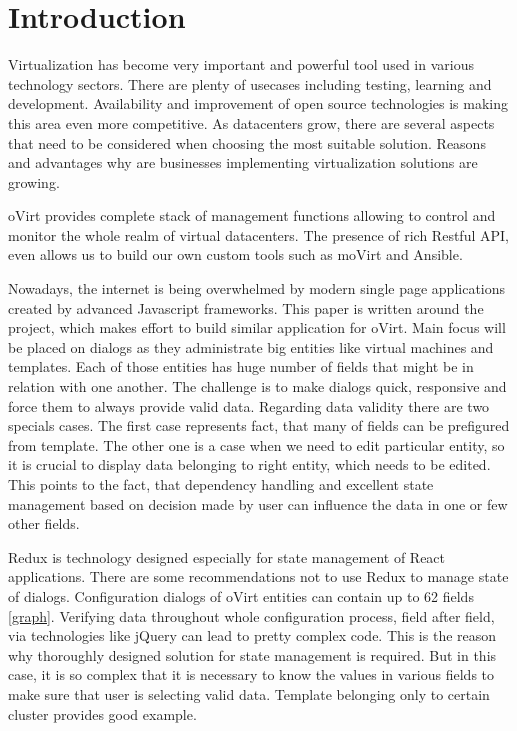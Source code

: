 
\chapter{Introduction}
Virtualization has become very important and powerful tool used in various technology sectors. There are plenty of usecases including testing, learning and development. Availability and improvement of open source technologies is making this area even more competitive. As datacenters grow, there are several aspects that need to be considered when choosing the most suitable solution. Reasons and advantages why are businesses implementing virtualization solutions are growing\cite{virtualization}.

oVirt\cite{oVirt} provides complete stack of management functions allowing to control and monitor the whole realm of virtual datacenters. The presence of rich Restful API, even allows us to build our own custom tools such as moVirt\cite{moVirt} and Ansible\cite{Ansible}. 

Nowadays, the internet is being overwhelmed by modern single page applications created by advanced Javascript frameworks. This paper is written around the project, which makes effort to build similar application for oVirt. Main focus will be placed on dialogs as they administrate big entities like virtual machines and templates. Each of those entities has huge number of fields that might be in relation with one another. The challenge is to make dialogs quick, responsive and force them to always provide valid data. Regarding data validity there are two specials cases. The first case represents fact, that many of fields can be prefigured from template. The other one is a case when we need to edit particular entity, so it is crucial to display data belonging to right entity, which needs to be edited. This points to the fact, that dependency handling and excellent state management based on decision made by user can influence the data in one or few other fields.

Redux is technology designed especially for state management of React\cite{React} applications. There are some recommendations not to use Redux\cite{Redux} to manage state of dialogs. Configuration dialogs of oVirt entities can contain up to 62 fields \ref{graph}. Verifying data throughout whole configuration process, field after field, via technologies like jQuery can lead to pretty complex code. This is the reason why thoroughly designed solution for state management is required. But in this case, it is so complex that it is necessary to know the values in various fields to make sure that user is selecting valid data. Template belonging only to certain cluster provides good example.

